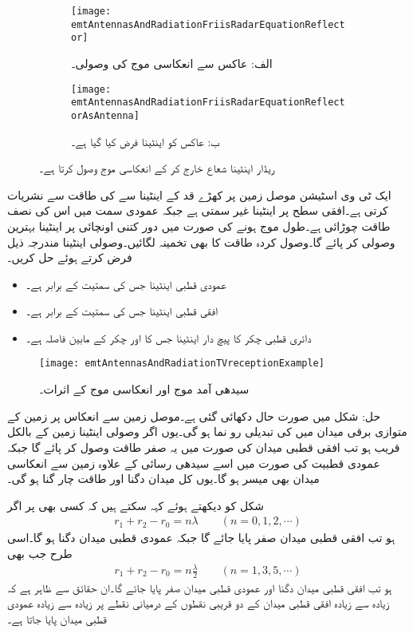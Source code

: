 \begin{figure}
\centering
\begin{subfigure}{0.5\textwidth}
\centering
\texttt{[image: emtAntennasAndRadiationFriisRadarEquationReflector]}
\caption*{الف: عاکس سے انعکاسی موج کی وصولی۔}
\end{subfigure}%
%
\begin{subfigure}{0.5\textwidth}
\centering
\texttt{[image: emtAntennasAndRadiationFriisRadarEquationReflectorAsAntenna]}
\caption*{ب: عاکس کو اینٹینا فرض کیا گیا ہے۔}
\end{subfigure}%
\caption{ریڈار اینٹینا شعاع خارج کر کے انعکاسی موج وصول کرتا ہے۔}
\label{شکل_اینٹینا_ریڈار_ب}
\end{figure}
ایک ٹی وی اسٹیشن موصل زمین پر کھڑے  قد کے اینٹینا سے  کی طاقت سے نشریات کرتی ہے۔افقی سطح پر اینٹینا غیر سمتی ہے جبکہ عمودی سمت میں اس کی نصف طاقت چوڑائی  ہے۔طول موج  ہونے کی صورت میں  دور کتنی اونچائی پر اینٹینا بہترین وصولی کر پائے گا۔وصول کردہ طاقت کا بھی تخمینہ لگائیں۔وصولی اینٹینا مندرجہ ذیل فرض کرتے ہوئے حل کریں۔
\begin{itemize}
\item
عمودی قطبی اینٹینا جس کی سمتیت  کے برابر ہے۔
\item
افقی قطبی اینٹینا جس کی سمتیت  کے برابر ہے۔
\item
دائری قطبی  چکر کا پیچ دار اینٹینا جس کا  اور چکر کے مابین فاصلہ  ہے۔
\end{itemize}

\begin{figure}
\centering
\texttt{[image: emtAntennasAndRadiationTVreceptionExample]}
\caption{سیدھی آمد موج اور انعکاسی موج کے اثرات۔}
\label{شکل_اینٹینا_سیدھی_آمد_انعکاسی_آمد}
\end{figure}


حل: شکل  میں صورت حال دکھائی گئی ہے۔موصل زمین سے انعکاس پر زمین کے متوازی برقی میدان میں  کی تبدیلی رو نما ہو گی۔یوں اگر وصولی اینٹینا زمین کے بالکل قریب ہو تب افقی قطبی میدان کی صورت میں یہ صفر طاقت وصول کر پائے گا جبکہ عمودی قطبیت کی صورت میں اسے سیدھی رسائی کے علاوہ زمین سے انعکاسی میدان بھی میسر ہو گا۔یوں کل میدان دگنا اور طاقت چار گنا ہو گی۔

شکل  کو دیکھتے ہوئے کہہ سکتے ہیں کہ کسی بھی   پر اگر
\begin{align}
r_1+r_2-r_0=n\lambda \quad \quad (n=0,1,2,\cdots)
\end{align}
ہو تب افقی قطبی میدان صفر پایا جائے گا جبکہ عمودی قطبی میدان دگنا ہو گا۔اسی طرح جب بھی
\begin{align}
r_1+r_2-r_0=n \frac{\lambda}{2} \quad \quad (n=1,3,5,\cdots)
\end{align}
ہو تب افقی قطبی میدان دگنا اور عمودی قطبی میدان صفر پایا جائے گا۔ان حقائق سے ظاہر ہے کہ زیادہ سے زیادہ افقی قطبی میدان کے دو قریبی نقطوں کے درمیانی نقطے پر زیادہ سے زیادہ عمودی قطبی میدان پایا جاتا ہے۔

